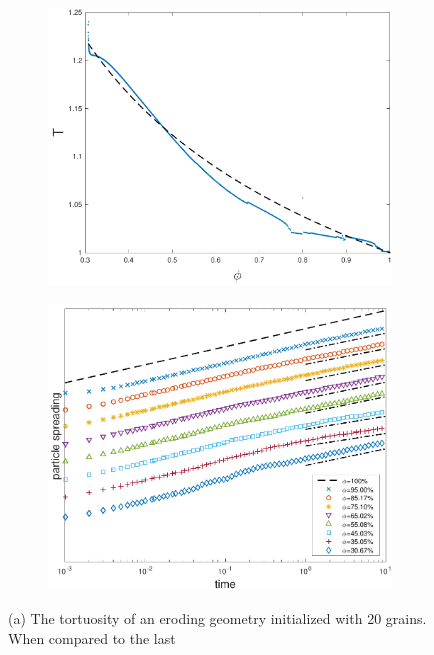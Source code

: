 \documentclass[preprint,10pt]{elsarticle}
\begin{document}
\begin{figure}[H]
\begin{subfigure}[b]{0.5\textwidth}
\includegraphics*[height = 0.8\linewidth]{./figs/tort_eulerian20b}
\caption{}
\end{subfigure}
\begin{subfigure}[b]{0.5\textwidth}
\includegraphics*[height=0.8\linewidth]{./figs/20b_dense_second_moment_ref}
\caption{}
\end{subfigure}
\caption{\label{fig:ErodingLow20Transport} (a) The tortuosity of an
eroding geometry initialized with 20 grains.  When compared to the last
}
\end{figure}
\end{document}
